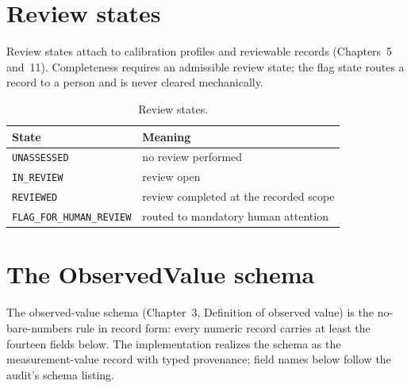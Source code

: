 \section{Review states}\label{enums:sec:review}

Review states attach to calibration profiles and reviewable records (Chapters~5 and~11). Completeness requires an admissible review state; the flag state routes a record to a person and is never cleared mechanically.

\begin{table}[htbp]
\centering
\caption{Review states.}\label{enums:tab:review}
\begin{tabular}{@{}ll@{}}
\toprule
State & Meaning \\
\midrule
\texttt{UNASSESSED} & no review performed \\
\texttt{IN\_REVIEW} & review open \\
\texttt{REVIEWED} & review completed at the recorded scope \\
\texttt{FLAG\_FOR\_HUMAN\_REVIEW} & routed to mandatory human attention \\
\bottomrule
\end{tabular}
\end{table}

\section{The ObservedValue schema}\label{enums:sec:observed}

The observed-value schema (Chapter~3, Definition of observed value) is the no-bare-numbers rule in record form: every numeric record carries at least the fourteen fields below. The implementation realizes the schema as the measurement-value record with typed provenance; field names below follow the audit's schema listing.

